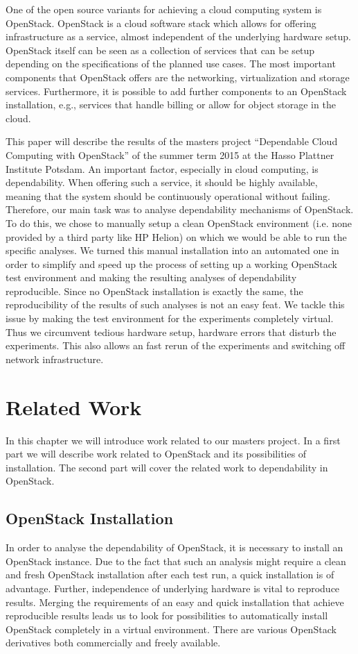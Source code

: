 \documentclass[conference]{IEEEtran}
\begin{document}
One of the open source variants for achieving a cloud computing system is OpenStack. OpenStack is a cloud software stack which allows for offering infrastructure as a service, almost independent of the underlying hardware setup. OpenStack itself can be seen as a collection of services that can be setup depending on the specifications of the planned use cases. The most important components that OpenStack offers are the networking, virtualization and storage services. Furthermore, it is possible to add further components to an OpenStack installation, e.g., services that handle billing or allow for object storage in the cloud. 

This paper will describe the results of the masters project ``Dependable Cloud Computing with OpenStack'' of the summer term 2015 at the Hasso Plattner Institute Potsdam. An important factor, especially in cloud computing, is dependability. When offering such a service, it should be highly available, meaning that the system should be continuously operational without failing. Therefore, our main task was to analyse dependability mechanisms of OpenStack. To do this, we chose to manually setup a clean OpenStack environment (i.e. none provided by a third party like HP Helion) on which we would be able to run the specific analyses. We turned this manual installation into an automated one in order to simplify and speed up the process of setting up a working OpenStack test environment and making the resulting analyses of dependability reproducible. Since no OpenStack installation is exactly the same, the reproducibility of the results of such analyses is not an easy feat. We tackle this issue by making the test environment for the experiments completely virtual. Thus we circumvent tedious hardware setup, hardware errors that disturb the experiments. This also allows an fast rerun of the experiments and switching off network infrastructure. 

\section{Related Work}
\label{related}
In this chapter we will introduce work related to our masters project. In a first part we will describe work related to OpenStack and its possibilities of installation. The second part will cover the related work to dependability in OpenStack.

\subsection{OpenStack Installation}
In order to analyse the dependability of OpenStack, it is necessary to install an OpenStack instance. Due to the fact that such an analysis might require a clean and fresh OpenStack installation after each test run, a quick installation is of advantage. Further, independence of underlying hardware is vital to reproduce results. Merging the requirements of an easy and quick installation that achieve reproducible results leads us to look for possibilities to automatically install OpenStack completely in a virtual environment. There are various OpenStack derivatives both commercially and freely available.
\end{document}
